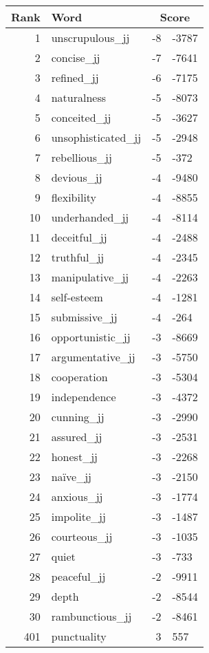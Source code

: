 \begin{longtable}[!htbp]{| rlr@{.}l |}
    \hline
    \textbf{Rank} & \textbf{Word} & \multicolumn{2}{c|}{\textbf{Score}} \\
    \hline
    \endhead
    1 & unscrupulous\_jj & -8 & -3787 \\
    2 & concise\_jj & -7 & -7641 \\
    3 & refined\_jj & -6 & -7175 \\
    4 & naturalness & -5 & -8073 \\
    5 & conceited\_jj & -5 & -3627 \\
    6 & unsophisticated\_jj & -5 & -2948 \\
    7 & rebellious\_jj & -5 & -372 \\
    8 & devious\_jj & -4 & -9480 \\
    9 & flexibility & -4 & -8855 \\
    10 & underhanded\_jj & -4 & -8114 \\
    11 & deceitful\_jj & -4 & -2488 \\
    12 & truthful\_jj & -4 & -2345 \\
    13 & manipulative\_jj & -4 & -2263 \\
    14 & self-esteem & -4 & -1281 \\
    15 & submissive\_jj & -4 & -264 \\
    16 & opportunistic\_jj & -3 & -8669 \\
    17 & argumentative\_jj & -3 & -5750 \\
    18 & cooperation & -3 & -5304 \\
    19 & independence & -3 & -4372 \\
    20 & cunning\_jj & -3 & -2990 \\
    21 & assured\_jj & -3 & -2531 \\
    22 & honest\_jj & -3 & -2268 \\
    23 & naïve\_jj & -3 & -2150 \\
    24 & anxious\_jj & -3 & -1774 \\
    25 & impolite\_jj & -3 & -1487 \\
    26 & courteous\_jj & -3 & -1035 \\
    27 & quiet & -3 & -733 \\
    28 & peaceful\_jj & -2 & -9911 \\
    29 & depth & -2 & -8544 \\
    30 & rambunctious\_jj & -2 & -8461 \\
    401 & punctuality & 3 & 557 \\

\end{longtable}
